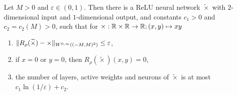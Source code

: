 \begin{proposition} \label{prop: quasi multiplication}
    Let $M > 0$ and $\varepsilon \in (0, 1)$. Then there is a ReLU neural network $\tilde{\times}$ with $2$-dimensional input and
    $1$-dimensional output, and constants $c_1 > 0$ and $c_2 = c_2(M) > 0$, such that for $\times: \mathbb{R} \times \mathbb{R} \to \mathbb{R}; (x, y) \mapsto xy$
    \begin{enumerate}
        \item $\lVert R_\rho(\widetilde{\times})- \times \rVert_{W^{0, \infty}((-M, M)^2)} \leq \varepsilon$,
        \item if $x = 0$ or $y = 0$, then $R_\rho(\tilde{\times})(x, y) = 0$,
        \item the number of layers, active weights and neurons of $\tilde{\times}$ is at most $c_1 \ln(1/\varepsilon) + c_2$.
    \end{enumerate}
\end{proposition}
